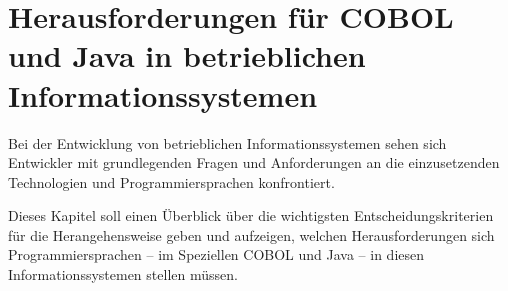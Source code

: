 \chapter{Herausforderungen für COBOL und Java in betrieblichen Informationssystemen}
Bei der Entwicklung von betrieblichen Informationssystemen sehen sich Entwickler mit grundlegenden Fragen und Anforderungen an die einzusetzenden Technologien und Programmiersprachen konfrontiert.

Dieses Kapitel soll einen Überblick über die wichtigsten Entscheidungskriterien für die Herangehensweise geben und aufzeigen, welchen Herausforderungen sich Programmiersprachen -- im Speziellen COBOL und Java -- in diesen Informationssystemen stellen müssen.

\label{ch:herausforderungen}
    
    
    
    
    
    